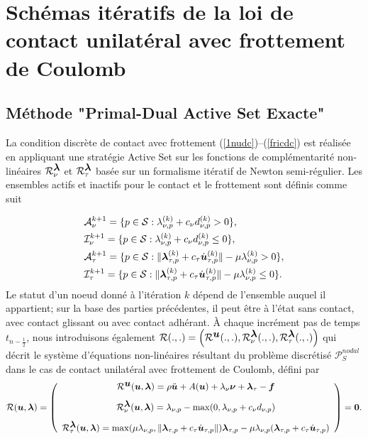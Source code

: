\section{Schémas itératifs de la loi de contact unilatéral avec frottement de Coulomb}
\label{fullcoulombactive}

\subsection{Méthode "Primal-Dual Active Set Exacte"}
La condition discrète de contact avec frottement (\ref{1nudc})--(\ref{fricdc}) est réalisée en appliquant une stratégie Active Set sur les fonctions de complémentarité non-linéaires ${\cal R}_{\nu}^{\mbox{\boldmath{$\lambda$}}}$ et ${\cal R}_{\tau}^{\mbox{\boldmath{$\lambda$}}}$ basée sur un formalisme itératif de Newton semi-régulier. Les ensembles actifs et inactifs pour le contact et le frottement sont définis comme suit

\begin{align*}
&{\cal A}_{\nu}^{k+1}=\{p\in {\cal S}:\lambda^{(k)}_{\nu,p}+c_{\nu} d^{(k)}_{\nu,p}> 0\},\\
&{\cal I}_{\nu}^{k+1}=\{p\in {\cal S}:\lambda^{(k)}_{\nu,p}+c_{\nu} d^{(k)}_{\nu,p}\le 0\},\\
&{\cal A}_{\tau}^{k+1}=\{p\in {\cal S}:\|\mbox{\boldmath{$\lambda$}}_{\tau, p}^{(k)}+c_\tau \dot{\mbox{\boldmath{$u$}}}_{\tau, p}^{(k)}\|-\mu \lambda_{\nu, p}^{(k)}> 0\},\\
&{\cal I}_{\tau}^{k+1}=\{p\in {\cal S}:\|\mbox{\boldmath{$\lambda$}}_{\tau, p}^{(k)}+c_\tau \dot{\mbox{\boldmath{$u$}}}_{\tau, p}^{(k)}\|-\mu \lambda_{\nu, p}^{(k)}\le 0 \}.
\end{align*}
Le statut d'un noeud donné à l'itération $k$ dépend de l'ensemble auquel il appartient; sur la base des parties précédentes, il peut être à l'état sans contact, avec contact glissant ou avec contact adhérant. À chaque incrément pas de temps $t_{n-\frac{1}{2}}$, nous introduisons également ${\cal R}(.,.)=\left({\cal R}^{\mbox{\boldmath{$u$}}}(.,.),{\cal R}_{\nu}^{\mbox{\boldmath{$\lambda$}}}(.,.),{\cal R}_{\tau}^{\mbox{\boldmath{$\lambda$}}}(.,.)\right)$ qui décrit le système d'équations non-linéaires résultant du problème discrétisé ${\mathcal P}_S^{nodal}$ dans le cas de contact unilatéral avec frottement de Coulomb, défini par
\begin{equation}
\label{Rsystem3}
{\cal R}(\mbox{\boldmath{$u$}},\mbox{\boldmath{$\lambda$}})=\left(
\begin{array}{c}
{\cal R}^{\mbox{\boldmath{$u$}}}(\mbox{\boldmath{$u$}},\mbox{\boldmath{$\lambda$}})=\rho \ddot{\mbox{\boldmath{$u$}}} + A(\mbox{\boldmath{$u$}}) + \lambda_{\nu}\mbox{\boldmath{$\nu$}} + \mbox{\boldmath{$\lambda$}}_{\tau}- \mbox{\boldmath{$f$}}\\[3mm]
{\cal R}_{\nu}^{\mbox{\boldmath{$\lambda$}}}(\mbox{\boldmath{$u$}},\mbox{\boldmath{$\lambda$}})=\lambda_{\nu, p}-\max(0,\lambda_{\nu, p}+c_{\nu}d_{\nu,p})\\[3mm]
{\cal R}_{\tau}^{\mbox{\boldmath{$\lambda$}}}(\mbox{\boldmath{$u$}},\mbox{\boldmath{$\lambda$}})=\max ( \mu \lambda_{\nu, p}, \|\mbox{\boldmath{$\lambda$}}_{\tau, p}+c_\tau \dot{\mbox{\boldmath{$u$}}}_{\tau, p}\|)\mbox{\boldmath{$\lambda$}}_{\tau, p}
- \mu \lambda_{\nu, p} (\mbox{\boldmath{$\lambda$}}_{\tau, p}+c_\tau \dot{\mbox{\boldmath{$u$}}}_{\tau, p})
\end{array}\right) = \mbox{\boldmath{$0$}}.
\end{equation}

